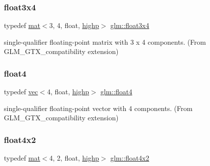 \subsubsection{\texorpdfstring{float3x4}{float3x4}}
{\footnotesize\ttfamily typedef \mbox{\hyperlink{structglm_1_1mat}{mat}}$<$3, 4, float, \mbox{\hyperlink{namespaceglm_a36ed105b07c7746804d7fdc7cc90ff25ac6f7eab42eacbb10d59a58e95e362074}{highp}}$>$ \mbox{\hyperlink{group__gtx__compatibility_ga53ae5a5af5943b6557eda4a6502e4484}{glm\+::float3x4}}}



single-\/qualifier floating-\/point matrix with 3 x 4 components. (From G\+L\+M\+\_\+\+G\+T\+X\+\_\+compatibility extension) 

\mbox{\label{group__gtx__compatibility_ga5b28e8af9bfee363940882dd7d1214b5}} 
\subsubsection{\texorpdfstring{float4}{float4}}
{\footnotesize\ttfamily typedef \mbox{\hyperlink{structglm_1_1vec}{vec}}$<$4, float, \mbox{\hyperlink{namespaceglm_a36ed105b07c7746804d7fdc7cc90ff25ac6f7eab42eacbb10d59a58e95e362074}{highp}}$>$ \mbox{\hyperlink{group__gtx__compatibility_ga5b28e8af9bfee363940882dd7d1214b5}{glm\+::float4}}}



single-\/qualifier floating-\/point vector with 4 components. (From G\+L\+M\+\_\+\+G\+T\+X\+\_\+compatibility extension) 

\mbox{\label{group__gtx__compatibility_gac7ba369299599a807491b9e871a0184e}} 
\subsubsection{\texorpdfstring{float4x2}{float4x2}}
{\footnotesize\ttfamily typedef \mbox{\hyperlink{structglm_1_1mat}{mat}}$<$4, 2, float, \mbox{\hyperlink{namespaceglm_a36ed105b07c7746804d7fdc7cc90ff25ac6f7eab42eacbb10d59a58e95e362074}{highp}}$>$ \mbox{\hyperlink{group__gtx__compatibility_gac7ba369299599a807491b9e871a0184e}{glm\+::float4x2}}}



